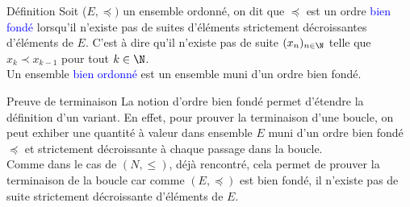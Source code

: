 \documentclass[10pt]{beamer}
\begin{document}
\begin{frame}[fragile]{\Ctitle}{\stitle}
	\begin{alertblock}{Définition}
		Soit ($E, \preccurlyeq)$ un ensemble ordonné, on dit que $\preccurlyeq$ est un ordre \textcolor{blue}{bien fondé} lorsqu'il n'existe pas de suites d'éléments strictement décroissantes d'éléments de $E$.
		C'est à dire qu'il n'existe pas de suite $(x_n)_{n \in \N}$ telle que $x_k \prec x_{k-1}$ pour tout $k \in \N$. \\
		Un ensemble \textcolor{blue}{bien ordonné} est un ensemble muni d'un ordre bien fondé.
	\end{alertblock}
\end{frame}


\begin{frame}[fragile]{\Ctitle}{\stitle}
	\begin{block}{Preuve de terminaison}
		La notion d'ordre bien fondé permet d'étendre la définition d'un variant. En effet, pour prouver la terminaison d'une boucle, on peut exhiber une quantité à valeur dans ensemble $E$ muni d'un ordre bien fondé $\preccurlyeq$ et strictement décroissante à chaque passage dans la boucle.\\
		\onslide<2-> Comme dans le cas de $(N, \leqslant)$, déjà rencontré, cela permet de prouver la terminaison de la boucle car comme $(E, \preccurlyeq)$ est bien fondé, il n'existe pas de suite strictement décroissante d'éléments de $E$.
	\end{block}
\end{frame}
\end{document}
